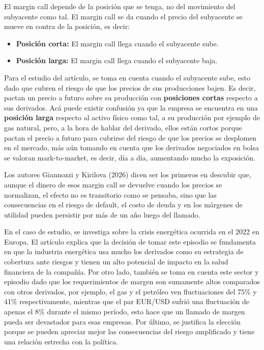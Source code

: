 \documentclass[11pt,letterpaper]{article}
\theoremstyle{plain}
\theoremstyle{definition}
\theoremstyle{remark}
\numberwithin{equation}{section}
\begin{document}
El margin call depende de la posición que se tenga, no del movimiento del subyacente como tal. El margin call se da cuando el precio del subyacente se mueve en contra de la posición, es decir:
\vspace{0.50 cm}

\begin{itemize}
    \item \textbf{Posición corta:} El margin call llega cuando el subyacente sube.
    \item \textbf{Posición larga:} El margin call llega cuando el subyacente baja.
\end{itemize}
\vspace{0.50 cm}

Para el estudio del artículo, se toma en cuenta cuando el subyacente sube, esto dado que cubren el riesgo de que los precios de sus producciones bajen. Es decir, pactan un precio a futuro sobre su producción con \textbf{posiciones cortas} respecto a sus derivados. Acá puede existir confusión ya que la empresa se encuentra en una \textbf{posición larga} respecto al activo físico como tal, a su producción por ejemplo de gas natural, pero, a la hora de hablar del derivado, ellos están cortos porque pactan el precio a futuro para cubrirse del riesgo de que los precios se desplomen en el mercado, más aún tomando en cuenta que los derivados negociados en bolsa se valoran mark-to-market, es decir, día a día, aumentando mucho la exposición. 
\vspace{0.50 cm}

Los autores Giannozzi y Kirilova (2026) dicen ser los primeros en descubir que, aunque el dinero de esos margin call se devuelve cuando los precios se normalizan, el efecto no es transitorio como se pensaba, sino que las consecuencias en el riesgo de default, el costo de deuda y en los márgenes de utilidad pueden persistir por más de un año luego del llamado. 
\vspace{0.50 cm}

En el caso de estudio, se investiga sobre la crisis energética ocurrida en el 2022 en Europa. El artículo explica que la decisión de tomar este episodio se fundamenta en que la industria energética usa mucho los derivados como su estrategia de cobertura ante riesgos y tienen un alto potencial de impacto en la salud financiera de la compañía. Por otro lado, también se toma en cuenta este sector y episodio dado que los requerimientos de margen son sumamente altos comparados con otros derivados, por ejemplo, el gas y el petróleo ven fluctuaciones del 75\% y 41\% respectivamente, mientras que el par EUR/USD sufrió una fluctuación de apenas el 8\% durante el mismo período, esto hace que un llamado de margen pueda ser devastador para esas empresas. Por último, se justifica la elección porque se pueden apreciar mejor las consecuencias del riesgo amplificado y tiene una relación estrecha con la política. 
\vspace{0.50 cm}
\end{document}
